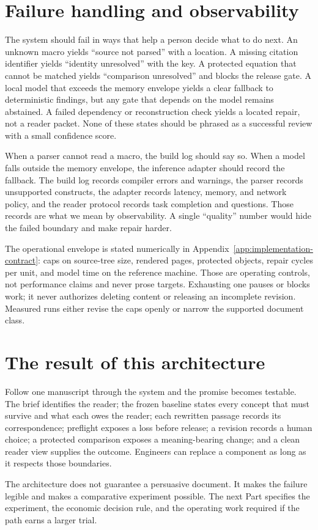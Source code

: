 \section{Failure handling and observability}
\label{sec:architecture-failure}

The system should fail in ways that help a person decide what to do next. An
unknown macro yields ``source not parsed'' with a location. A missing citation
identifier yields ``identity unresolved'' with the key. A protected equation
that cannot be matched yields ``comparison unresolved'' and blocks the release
gate. A local model that exceeds the memory envelope yields a clear fallback to
deterministic findings, but any gate that depends on the model remains
abstained. A failed dependency or reconstruction check yields a located repair,
not a reader packet. None of these states should be phrased as a successful
review with a small confidence score.

When a parser cannot read a macro, the build log should say so. When a model
falls outside the memory envelope, the inference adapter should record the
fallback. The build log records compiler errors and warnings, the parser
records unsupported constructs, the adapter records latency, memory, and
network policy, and the reader protocol records task completion and questions.
Those records are what we mean by observability. A single ``quality'' number
would hide the failed boundary and make repair harder.

The operational envelope is stated numerically in
Appendix~\ref{app:implementation-contract}: caps on source-tree size, rendered
pages, protected objects, repair cycles per unit, and model time on the reference
machine. Those are operating controls, not performance claims and never prose
targets. Exhausting one pauses or blocks work; it never authorizes deleting
content or releasing an incomplete revision. Measured runs either revise the caps
openly or narrow the supported document class.

\section{The result of this architecture}
\label{sec:architecture-conclusion}

Follow one manuscript through the system and the promise becomes testable. The
brief identifies the reader; the frozen baseline states every concept that must
survive and what each owes the reader; each rewritten passage records its
correspondence; preflight exposes a loss before release; a revision records a
human choice; a protected comparison exposes a meaning-bearing change; and a
clean reader view supplies the outcome. Engineers can replace a component as long
as it respects those boundaries.

The architecture does not guarantee a persuasive document. It makes the
failure legible and makes a comparative experiment possible. The next Part
specifies the
experiment, the economic decision rule, and the operating work required if the
path earns a larger trial.
